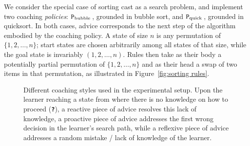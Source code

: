\documentclass[runningheads]{llncs}
\newcommand{\bubblecoach}{\ensuremath{\texttt{P}_{\rm bubble}}\,}
\newcommand{\quickcoach}{\ensuremath{\texttt{P}_{\rm quick}}\,}
\newcommand{\qmark}{\texttt{\textbf{?}}}
\begin{document}
We consider the special case of sorting cast as a search problem, and implement two coaching \emph{policies}: \bubblecoach, grounded in bubble sort, and \quickcoach, grounded in quicksort. In both cases, advice corresponds to the next step of the algorithm embodied by the coaching policy. A state of size $n$ is any permutation of $\{1,2,\ldots,n\}$; start states are chosen arbitrarily among all states of that size, while the goal state is invariably $(1,2,\ldots,n)$. Rules then take as their body a potentially partial permutation of $\{1,2,\ldots,n\}$ and as their head a swap of two items in that permutation, as illustrated in Figure~\ref{fig:sorting rules}.

\begin{figure}[!tb]
	\centering
	
	\caption{Different coaching styles used in the experimental setup. Upon the learner reaching a state from where there is no knowledge on how to proceed (\textcolor{unknownColor}{\qmark}), a reactive piece of advice resolves this lack of knowledge, a proactive piece of advice addresses the first wrong decision in the learner's search path, while a reflexive piece of advice addresses a random mistake / lack of knowledge of the learner.}
	\label{fig:coaching styles}
\end{figure}
\end{document}
